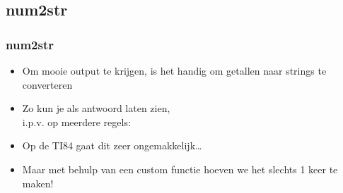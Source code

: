 \subsection{num2str}

\begin{frame}
\frametitle{num2str}

\begin{itemize}
  \item<1-> Om mooie output te krijgen, is het handig om getallen naar strings te converteren
  \item<2-> Zo kun je als antwoord  laten zien,\\%
  			i.p.v. op meerdere regels:
\end{itemize}
\begin{itemize}
  \item<3-> Op de TI84 gaat dit zeer ongemakkelijk\ldots
  \item<4-> Maar met behulp van een custom functie hoeven we het slechts 1 keer te maken!
\end{itemize}

\end{frame}



